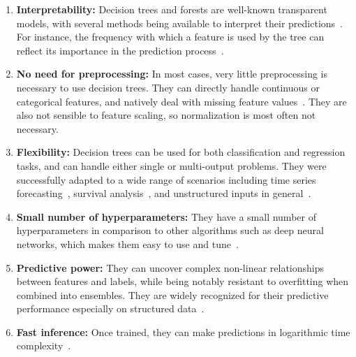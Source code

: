 \begin{itemize}
\begin{enumerate}
    \item \textbf{Interpretability:} Decision trees and forests are well-known transparent models, with several methods being available to interpret their predictions~\cite{breiman1984classification, lundberg2019explainable, agarwal2023mdi}. For instance, the frequency with which a feature is used by the tree can reflect its importance in the prediction process~\cite{breiman1984classification}.
    \item \textbf{No need for preprocessing:} In most cases, very little preprocessing is necessary to use decision trees. They can directly handle continuous or categorical features, and natively deal with missing feature values~\cite{breiman1984classification}. They are also not sensible to feature scaling, so normalization is most often not necessary.
    \item \textbf{Flexibility:} Decision trees can be used for both classification and regression tasks, and can handle either single or multi-output problems. They were successfully adapted to a wide range of scenarios including time series forecasting~\cite{}, survival analysis~\cite{}, and unstructured inputs in general~\cite{zhou2019deepa}.
    \item \textbf{Small number of hyperparameters:}
    They have a small number of hyperparameters in comparison to other algorithms such as deep neural networks, which makes them easy to use and tune~\cite{zhou2019deepa}. %
    \item \textbf{Predictive power:} They can uncover complex non-linear relationships between features and labels, while being notably resistant to overfitting when combined into ensembles. They are widely recognized for their predictive performance especially on structured data~\cite{grinsztajn2022why}.
    \item \textbf{Fast inference:} Once trained, they can make predictions in logarithmic time complexity~\cite{breiman1984classification}.
\end{enumerate}


\end{itemize}
